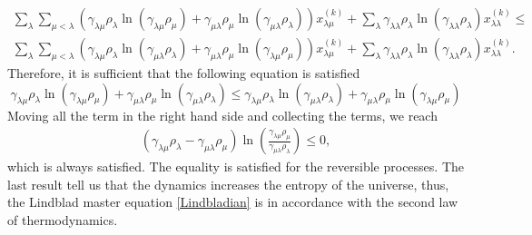 \begin{equation}
    \begin{split}
        \sum_{\lambda}\sum_{\mu<\lambda}\left(\gamma_{\lambda\mu}\rho_\lambda\ln\left(\gamma_{\lambda\mu}\rho_\mu\right) + \gamma_{\mu\lambda}\rho_\mu\ln\left(\gamma_{\mu\lambda}\rho_\lambda\right) \right) x^{(k)}_{\lambda\mu} +\sum_\lambda \gamma_{\lambda\lambda}\rho_\lambda\ln\left(\gamma_{\lambda\lambda}\rho_\lambda\right) x^{(k)}_{\lambda\lambda} \leq\\ 
        \sum_{\lambda}\sum_{\mu<\lambda}\left(\gamma_{\lambda\mu}\rho_\lambda\ln\left(\gamma_{\mu\lambda}\rho_\lambda\right)+ \gamma_{\mu\lambda}\rho_\mu\ln\left(\gamma_{\lambda\mu}\rho_\mu\right)\right)x^{(k)}_{\lambda\mu} + \sum_{\lambda}\gamma_{\lambda\lambda}\rho_\lambda\ln\left(\gamma_{\lambda\lambda}\rho_\lambda\right) x_{\lambda\lambda}^{(k)} .
    \end{split}
\end{equation}
Therefore, it is sufficient that the following equation is satisfied
\begin{equation}
    \gamma_{\lambda\mu}\rho_\lambda\ln\left(\gamma_{\lambda\mu}\rho_\mu\right) + \gamma_{\mu\lambda}\rho_\mu\ln\left(\gamma_{\mu\lambda}\rho_\lambda\right) \leq \gamma_{\lambda\mu}\rho_\lambda\ln\left(\gamma_{\mu\lambda}\rho_\lambda\right)+ \gamma_{\mu\lambda}\rho_\mu\ln\left(\gamma_{\lambda\mu}\rho_\mu\right)
\end{equation}
Moving all the term in the right hand side and collecting the terms, we reach
\begin{equation}
    \begin{split}
        \left(\gamma_{\lambda\mu}\rho_\lambda- \gamma_{\mu\lambda}\rho_\mu\right)\ln\left(\frac{\gamma_{\lambda\mu}\rho_\mu}{\gamma_{\mu\lambda}\rho_\lambda}\right)\leq 0,
    \end{split}
\end{equation}
which is always satisfied. The equality is satisfied for the reversible processes.
The last result tell us that the dynamics increases the entropy of the universe, thus, the Lindblad master equation \eqref{Lindbladian} is in accordance with the second law of thermodynamics.

